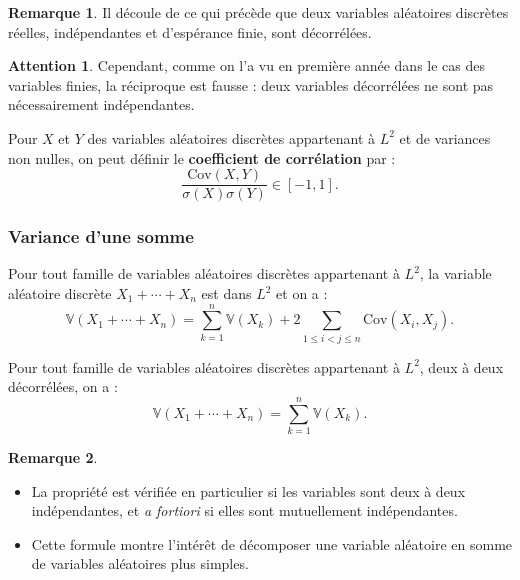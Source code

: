 \documentclass[french]{article}
\newcommand{\V}{\mathbb{V}}
\theoremstyle{plain}
\theoremstyle{definition}
\newtheorem*{rmq}{Remarque}
\newtheorem*{attention}{Attention}
\theoremstyle{remark}
\begin{document}
\begin{rmq}
	Il découle de ce qui précède que deux variables aléatoires discrètes réelles, indépendantes et d'espérance finie, sont décorrélées.
\end{rmq}

\begin{attention}
	Cependant, comme on l'a vu en première année dans le cas des variables finies, la réciproque est fausse : deux variables décorrélées ne sont pas nécessairement indépendantes.
\end{attention}

\begin{dfn}[HP]
	Pour $X$ et $Y$ des variables aléatoires discrètes appartenant à $L^2$ et de variances non nulles, on peut définir le \textbf{coefficient de corrélation} par :
	$$\frac{\text{Cov}(X,Y)}{\sigma(X)\sigma(Y)}\in[-1,1].$$
\end{dfn}

\subsubsection*{Variance d'une somme}

\begin{thm}%
	Pour tout famille de variables aléatoires discrètes appartenant à $L^2$, la variable aléatoire discrète $X_1+\cdots+X_n$ est dans $L^2$ et on a : $$\V(X_1+\cdots+X_n)=\sum_{k=1}^{n}\V(X_k)+2\sum_{1\leqslant i<j\leqslant n}\text{Cov}(X_i,X_j).$$
\end{thm}

\begin{cor}%
	Pour tout famille de variables aléatoires discrètes appartenant à $L^2$, deux à deux décorrélées, on a : 
	$$\V(X_1+\cdots+X_n)=\sum_{k=1}^{n}\V(X_k).$$
\end{cor}

\begin{rmq}
	\begin{itemize}
		\item La propriété est vérifiée en particulier si les variables sont deux à deux indépendantes, et \textit{a fortiori} si elles sont mutuellement indépendantes.
		\item Cette formule montre l'intérêt de décomposer une variable aléatoire en somme de variables aléatoires plus simples.
	\end{itemize}
\end{rmq}
\end{document}
